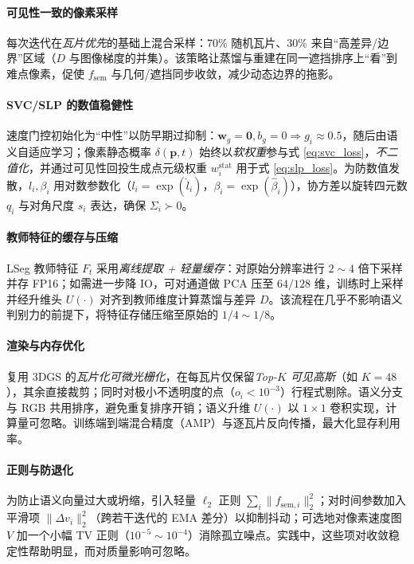 \documentclass[10pt,conference]{IEEEtran} %
\begin{document}
\paragraph{可见性一致的像素采样}
每次迭代在\emph{瓦片优先}的基础上混合采样：$70\%$ 随机瓦片、$30\%$ 来自“高差异/边界”区域（$D$ 与图像梯度的并集）。该策略让蒸馏与重建在同一遮挡排序上“看”到难点像素，促使 $f_{\mathrm{sem}}$ 与几何/遮挡同步收敛，减少动态边界的拖影。

\paragraph{SVC/SLP 的数值稳健性}
速度门控初始化为“中性”以防早期过抑制：$\mathbf w_g{=}\mathbf 0,b_g{=}0\Rightarrow g_i{\approx}0.5$，随后由语义自适应学习；像素静态概率 $\delta(\mathbf p,t)$ 始终以\emph{软权重}参与式 \eqref{eq:svc_loss}，\emph{不二值化}，并通过可见性回投生成点元级权重 $w_i^{\mathrm{stat}}$ 用于式 \eqref{eq:slp_loss}。为防数值发散，$l_i,\beta_i$ 用对数参数化（$l_i{=}\exp(\hat l_i)$，$\beta_i{=}\exp(\hat \beta_i)$），协方差以旋转四元数 $q_i$ 与对角尺度 $s_i$ 表达，确保 $\Sigma_i\!\succ\!0$。

\paragraph{教师特征的缓存与压缩}
LSeg 教师特征 $F_t$ 采用\emph{离线提取 + 轻量缓存}：对原始分辨率进行 $2{\sim}4$ 倍下采样并存 FP16；如需进一步降 IO，可对通道做 PCA 压至 $64/128$ 维，训练时上采样并经升维头 $U(\cdot)$ 对齐到教师维度计算蒸馏与差异 $D$。该流程在几乎不影响语义判别力的前提下，将特征存储压缩至原始的 $1/4{\sim}1/8$。

\paragraph{渲染与内存优化}
复用 3DGS 的\emph{瓦片化可微光栅化}，在每瓦片仅保留\emph{Top-$K$ 可见高斯}（如 $K{=}48$），其余直接裁剪；同时对极小不透明度的点（$o_i{<}10^{-3}$）行程式剔除。语义分支与 RGB 共用排序，避免重复排序开销；语义升维 $U(\cdot)$ 以 $1{\times}1$ 卷积实现，计算量可忽略。训练端到端混合精度（AMP）与逐瓦片反向传播，最大化显存利用率。

\paragraph{正则与防退化}
为防止语义向量过大或坍缩，引入轻量 $\ell_2$ 正则 $\sum_i\|f_{\mathrm{sem},i}\|_2^2$；对时间参数加入平滑项 $\|\Delta v_i\|_2^2$（跨若干迭代的 EMA 差分）以抑制抖动；可选地对像素速度图 $V$ 加一个小幅 TV 正则（$10^{-5}{\sim}10^{-4}$）消除孤立噪点。实践中，这些项对收敛稳定性帮助明显，而对质量影响可忽略。
\end{document}
